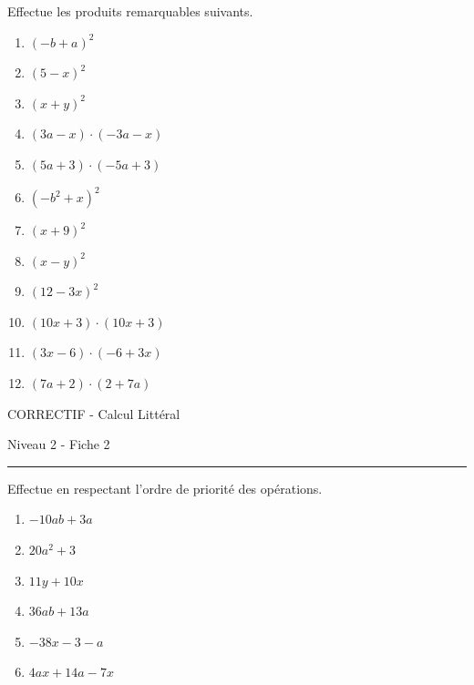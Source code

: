 \documentclass[12pt,parskip=half-, twoside=semi]{scrartcl}
\begin{document}
\begin{exercise}Effectue les produits remarquables suivants.
  \begin{enumerate}[cols=3]
      \item $(-b+a)^2$
      \item $(5-x)^2$
      \item $(x+y)^2$
      \item $(3 a-x) \cdot(-3 a-x)$
      \item $(5a+3) \cdot(-5a+3)$
      \item $\left(-b^2+x\right)^2$
      \item $(x+9)^2$
      \item $(x-y)^2$
      \item $(12-3 x)^2$
      \item $(10 x+3) \cdot(10 x+3)$
      \item $(3 x-6) \cdot(-6+3 x)$
      \item $(7 a+2) \cdot(2+7 a)$
  \end{enumerate}
\end{exercise}





\begin{center}
  \bfseries
  \begin{Huge}
    CORRECTIF - Calcul Littéral
  \end{Huge}
  \smallbreak
  \begin{large}
    Niveau 2  - Fiche 2
  \end{large}
  \smallbreak
  \rule[10pt]{.5\linewidth}{1 pt}
\end{center}

\setcounter{exercise}{0}

\begin{exercise}Effectue en respectant l'ordre de priorité des opérations.
  \begin{enumerate}[cols=2]
    \item $-10ab+3a$
    \item $20a^2+3$
    \item $11y+10x$
    \item $36ab+13a$
    \item $-38x-3-a$
    \item $4ax+14a-7x$
  \end{enumerate}
\end{exercise}
\end{document}
